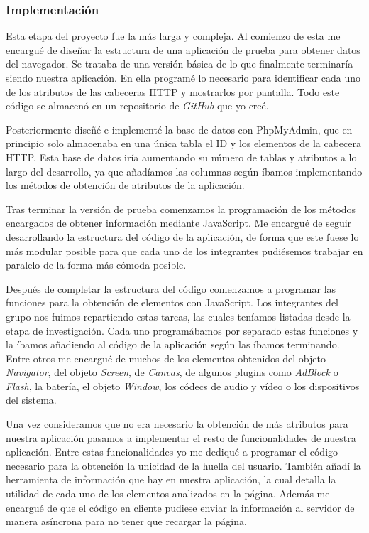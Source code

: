 \subsubsection{Implementación}
Esta etapa del proyecto fue la más larga y compleja. Al comienzo de esta me encargué de diseñar la estructura de una aplicación de prueba para obtener datos del navegador. Se trataba de una versión básica de lo que finalmente terminaría siendo nuestra aplicación. En ella programé lo necesario para identificar cada uno de los atributos de las cabeceras HTTP y mostrarlos por pantalla. Todo este código se almacenó en un repositorio de \textit{GitHub} que yo creé.\par
Posteriormente diseñé e implementé la base de datos con PhpMyAdmin, que en principio solo almacenaba en una única tabla el ID y los elementos de la cabecera HTTP. Esta base de datos iría aumentando su número de tablas y atributos a lo largo del desarrollo, ya que añadíamos las columnas según íbamos implementando los métodos de obtención de atributos de la aplicación.\par
Tras terminar la versión de prueba comenzamos la programación de los métodos encargados de obtener información mediante JavaScript. Me encargué de seguir desarrollando la estructura del código de la aplicación, de forma que este fuese lo más modular posible para que cada uno de los integrantes pudiésemos trabajar en paralelo de la forma más cómoda posible.\par
Después de completar la estructura del código comenzamos a programar las funciones para la obtención de elementos con JavaScript. Los integrantes del grupo nos fuimos repartiendo estas tareas, las cuales teníamos listadas desde la etapa de investigación. Cada uno programábamos por separado estas funciones y la íbamos añadiendo al código de la aplicación según las íbamos terminando. Entre otros me encargué de muchos de los elementos obtenidos del objeto \textit{Navigator}, del objeto \textit{Screen}, de \textit{Canvas}, de algunos plugins como \textit{AdBlock} o \textit{Flash}, la batería, el objeto \textit{Window}, los códecs de audio y vídeo o los dispositivos del sistema.\par
Una vez consideramos que no era necesario la obtención de más atributos para nuestra aplicación pasamos a implementar el resto de funcionalidades de nuestra aplicación. Entre estas funcionalidades yo me dediqué a programar el código necesario para la obtención la unicidad de la huella del usuario. También añadí la herramienta de información que hay en nuestra aplicación, la cual detalla la utilidad de cada uno de los elementos analizados en la página. Además me encargué de que el código en cliente pudiese enviar la información al servidor de manera asíncrona para no tener que recargar la página.\par 

